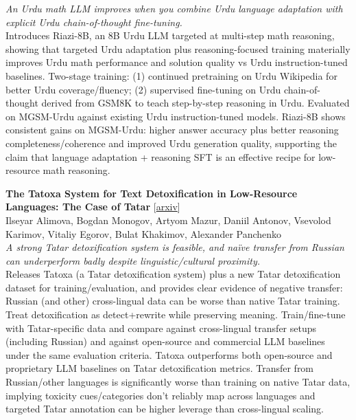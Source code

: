 \documentclass[12pt,letterpaper]{article}
\begin{document}
{\small\textit{An Urdu math LLM improves when you combine Urdu language adaptation with explicit Urdu chain-of-thought fine-tuning.}}\\[1pt]
{\footnotesize Introduces Riazi-8B, an 8B Urdu LLM targeted at multi-step math reasoning, showing that targeted Urdu adaptation plus reasoning-focused training materially improves Urdu math performance and solution quality vs Urdu instruction-tuned baselines. Two-stage training: (1) continued pretraining on Urdu Wikipedia for better Urdu coverage/fluency; (2) supervised fine-tuning on Urdu chain-of-thought derived from GSM8K to teach step-by-step reasoning in Urdu. Evaluated on MGSM-Urdu against existing Urdu instruction-tuned models. Riazi-8B shows consistent gains on MGSM-Urdu: higher answer accuracy plus better reasoning completeness/coherence and improved Urdu generation quality, supporting the claim that language adaptation + reasoning SFT is an effective recipe for low-resource math reasoning.}

\medskip

{\small\textbf{The Tatoxa System for Text Detoxification in Low-Resource Languages: The Case of Tatar}} {\scriptsize[\href{https://arxiv.org/abs/2606.26015}{arxiv}]}\\
{\scriptsize Ilseyar Alimova, Bogdan Monogov, Artyom Mazur, Daniil Antonov, Vsevolod Karimov, Vitaliy Egorov, Bulat Khakimov, Alexander Panchenko}\\

{\small\textit{A strong Tatar detoxification system is feasible, and naïve transfer from Russian can underperform badly despite linguistic/cultural proximity.}}\\[1pt]
{\footnotesize Releases Tatoxa (a Tatar detoxification system) plus a new Tatar detoxification dataset for training/evaluation, and provides clear evidence of negative transfer: Russian (and other) cross-lingual data can be worse than native Tatar training. Treat detoxification as detect+rewrite while preserving meaning. Train/fine-tune with Tatar-specific data and compare against cross-lingual transfer setups (including Russian) and against open-source and commercial LLM baselines under the same evaluation criteria. Tatoxa outperforms both open-source and proprietary LLM baselines on Tatar detoxification metrics. Transfer from Russian/other languages is significantly worse than training on native Tatar data, implying toxicity cues/categories don't reliably map across languages and targeted Tatar annotation can be higher leverage than cross-lingual scaling.}
\end{document}
